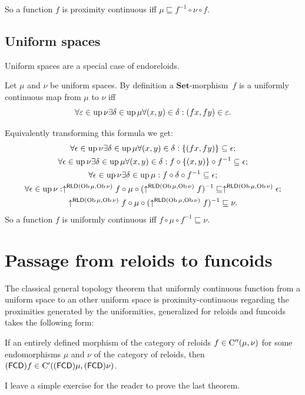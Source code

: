 So a function $f$ is proximity continuous iff $\mu\sqsubseteq f^{-1}\circ\nu\circ f$.


\subsection{Uniform spaces}

Uniform spaces are a special case of endoreloids.

Let $\mu$ and $\nu$ be uniform spaces. By definition a $\mathbf{Set}$-morphism~$f$
is a uniformly continuous map from $\mu$ to $\nu$ iff 
\[
\forall\varepsilon\in\operatorname{up}\nu\exists\delta\in\operatorname{up}\mu\forall(x,y)\in\delta:(fx,fy)\in\varepsilon.
\]


Equivalently transforming this formula we get:
\begin{gather*}
\forall\epsilon\in\operatorname{up}\nu\exists\delta\in\operatorname{up}\mu\forall(x,y)\in\delta:\{(fx,fy)\}\subseteq\epsilon;\\
\forall\epsilon\in\operatorname{up}\nu\exists\delta\in\operatorname{up}\mu\forall(x,y)\in\delta:f\circ\{(x,y)\}\circ f^{-1}\subseteq\epsilon;\\
\forall\epsilon\in\operatorname{up}\nu\exists\delta\in\operatorname{up}\mu:f\circ\delta\circ f^{-1}\subseteq\epsilon;\\
\forall\epsilon\in\operatorname{up}\nu:\uparrow^{\mathsf{RLD}(\operatorname{Ob}\mu,\operatorname{Ob}\nu)}f\circ\mu\circ(\uparrow^{\mathsf{RLD}(\operatorname{Ob}\mu,\operatorname{Ob}\nu)}f)^{-1}\sqsubseteq\uparrow^{\mathsf{RLD}(\operatorname{Ob}\mu,\operatorname{Ob}\nu)}\epsilon;\\
\uparrow^{\mathsf{RLD}(\operatorname{Ob}\mu,\operatorname{Ob}\nu)}f\circ\mu\circ(\uparrow^{\mathsf{RLD}(\operatorname{Ob}\mu,\operatorname{Ob}\nu)}f)^{-1}\sqsubseteq\nu.
\end{gather*}
So a function $f$ is uniformly continuous iff $f\circ\mu\circ f^{-1}\sqsubseteq\nu$.


\section{Passage from reloids to funcoids}

The classical general topology theorem that uniformly continuous function
from a uniform space to an other uniform space is proximity-continuous
regarding the proximities generated by the uniformities, generalized
for reloids and funcoids takes the following form:
\begin{thm}
If an entirely defined morphism of the category of reloids $f\in\mathrm{C}''(\mu,\nu)$
for some endomorphisms $\mu$ and $\nu$ of the category of reloids,
then $\mathsf{(\mathsf{FCD})}f\in\mathrm{C}'((\mathsf{FCD})\mu,(\mathsf{FCD})\nu)$.\end{thm}
\begin{xca}
I leave a simple exercise for the reader to prove the last theorem.
\end{xca}


